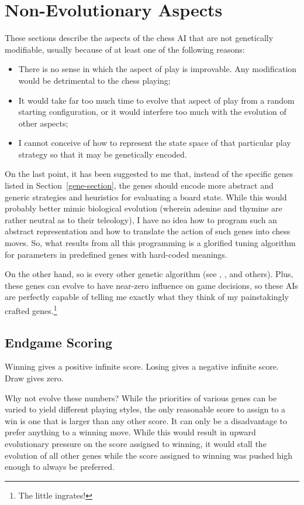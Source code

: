\documentclass[letterpaper]{article}
\renewcommand{\_}{\allowbreak\textunderscore\allowbreak}
\begin{document}
\section{Non-Evolutionary Aspects}

These sections describe the aspects of the chess AI that are not genetically modifiable, usually because of at least one of the following reasons:
\begin{itemize}
	\item There is no sense in which the aspect of play is improvable. Any modification would be detrimental to the chess playing;
	\item It would take far too much time to evolve that aspect of play from a random starting configuration, or it would interfere too much with the evolution of other aspects;
	\item I cannot conceive of how to represent the state space of that particular play strategy so that it may be genetically encoded.
\end{itemize}
On the last point, it has been suggested to me that, instead of the specific genes listed in Section~\ref{gene-section}, the genes should encode more abstract and generic strategies and heuristics for evaluating a board state. While this would probably better mimic biological evolution (wherein adenine and thymine are rather neutral as to their teleology), I have no idea how to program such an abstract representation and how to translate the action of such genes into chess moves. So, what results from all this programming is a glorified tuning algorithm for parameters in predefined genes with hard-coded meanings.

On the other hand, so is every other genetic algorithm (see \cite{evolved-antenna}, \cite{evolved-stellarator}, and others). Plus, these genes can evolve to have near-zero influence on game decisions, so these AIs are perfectly capable of telling me exactly what they think of my painstakingly crafted genes.\footnote{The little ingrates!}

\subsection{Endgame Scoring}

Winning gives a positive infinite score.
Losing gives a negative infinite score.
Draw gives zero.

Why not evolve these numbers? While the priorities of various genes can be varied to yield different playing styles, the only reasonable score to assign to a win is one that is larger than any other score. It can only be a disadvantage to prefer anything to a winning move. While this would result in upward evolutionary pressure on the score assigned to winning, it would stall the evolution of all other genes while the score assigned to winning was pushed high enough to always be preferred.
\end{document}
